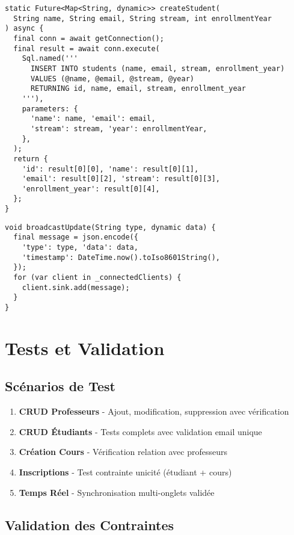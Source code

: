 \documentclass{article}
\begin{document}
\begin{lstlisting}[style=dartcode, caption=Création d'un étudiant (Backend)]
static Future<Map<String, dynamic>> createStudent(
  String name, String email, String stream, int enrollmentYear
) async {
  final conn = await getConnection();
  final result = await conn.execute(
    Sql.named('''
      INSERT INTO students (name, email, stream, enrollment_year)
      VALUES (@name, @email, @stream, @year)
      RETURNING id, name, email, stream, enrollment_year
    '''),
    parameters: {
      'name': name, 'email': email,
      'stream': stream, 'year': enrollmentYear,
    },
  );
  return {
    'id': result[0][0], 'name': result[0][1],
    'email': result[0][2], 'stream': result[0][3],
    'enrollment_year': result[0][4],
  };
}
\end{lstlisting}

\begin{lstlisting}[style=dartcode, caption=Diffusion WebSocket]
void broadcastUpdate(String type, dynamic data) {
  final message = json.encode({
    'type': type, 'data': data,
    'timestamp': DateTime.now().toIso8601String(),
  });
  for (var client in _connectedClients) {
    client.sink.add(message);
  }
}
\end{lstlisting}

\clearpage
\section{Tests et Validation}

\subsection{Scénarios de Test}

\begin{enumerate}
    \item \textbf{CRUD Professeurs} - Ajout, modification, suppression avec vérification
    \item \textbf{CRUD Étudiants} - Tests complets avec validation email unique
    \item \textbf{Création Cours} - Vérification relation avec professeurs
    \item \textbf{Inscriptions} - Test contrainte unicité (étudiant + cours)
    \item \textbf{Temps Réel} - Synchronisation multi-onglets validée
\end{enumerate}

\subsection{Validation des Contraintes}
\end{document}

